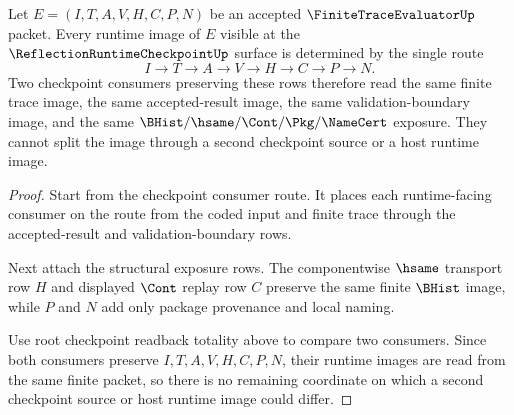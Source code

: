 \begin{theorem}
\label{thm:finite-trace-evaluator-runtime-image-route-determinacy}
Let $E=(I,T,A,V,H,C,P,N)$ be an accepted $\FiniteTraceEvaluatorUp$ packet.
Every runtime image of $E$ visible at the
$\ReflectionRuntimeCheckpointUp$ surface is determined by the single route
$$
I \to T \to A \to V \to H \to C \to P \to N.
$$
Two checkpoint consumers preserving these rows therefore read the same finite
trace image, the same accepted-result image, the same validation-boundary
image, and the same $\BHist/\hsame/\Cont/\Pkg/\NameCert$ exposure. They cannot
split the image through a second checkpoint source or a host runtime image.
\end{theorem}
\begin{proof}
Start from the checkpoint consumer route. It places each runtime-facing
consumer on the route from the coded input and finite trace through the
accepted-result and validation-boundary rows.

Next attach the structural exposure rows. The componentwise $\hsame$ transport
row $H$ and displayed $\Cont$ replay row $C$ preserve the same finite
$\BHist$ image, while $P$ and $N$ add only package provenance and local naming.

Use root checkpoint readback totality above to compare two consumers. Since
both consumers preserve $I,T,A,V,H,C,P,N$, their runtime images are read from
the same finite packet, so there is no remaining coordinate on which a second
checkpoint source or host runtime image could differ.
\end{proof}

